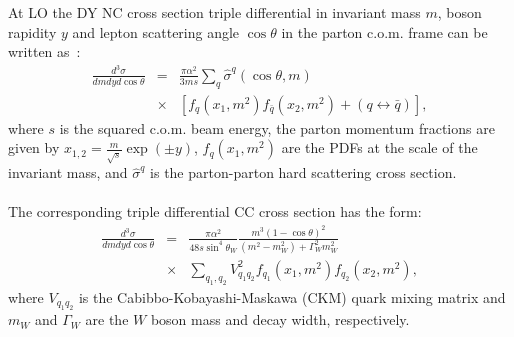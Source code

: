 
At LO the DY NC cross section triple differential in invariant mass \(m\), boson rapidity \(y\) 
and lepton scattering angle \(\cos\theta\) in the parton c.o.m. frame can be written as~\cite{Drell:1970wh,Yamada:1981mw}:
\begin{eqnarray}
 \frac{d^3\sigma}{dm{d}y d\cos\theta} &=&  
 \frac{\pi\alpha^2}{3ms}\sum\limits_{q}\hat{\sigma}^{q}(\cos\theta, m)  \nonumber \\
 &\times &\left[f_q(x_1,m^2)f_{\bar{q}}(x_2,m^2) 
 + (q\leftrightarrow\bar{q})\right],
\end{eqnarray}
where \(s\) is the squared c.o.m. beam energy, the parton momentum fractions are given by \(x_{1,2} = \frac{m}{\sqrt{s}}\exp(\pm y)\), $f_q(x_1,m^2)$ 
are the PDFs at the scale of the invariant mass, and 
$\hat{\sigma}^{q}$ is the parton-parton hard scattering cross section. 
%
\\
\\
The corresponding triple differential CC cross section has the form:
\begin{eqnarray}
\frac{d^3\sigma}{dmdyd\cos\theta} &=&
 \frac{\pi\alpha^2}{48s\sin^4\theta_W}
 \frac{m^3(1-\cos\theta)^2}{(m^2-m_W^2)+\Gamma_W^2m_W^2}  \nonumber \\
 &\times& \sum_{q_1,q_2}V_{q_1q_2}^2f_{q_1}(x_1,m^2)f_{q_2}(x_2,m^2),
\end{eqnarray}
where \(V_{q_1q_2}\) is the Cabibbo-Kobayashi-Maskawa (CKM) quark mixing matrix and \(m_W\) and \(\Gamma_W\)
are the \(W\) boson mass and decay width, respectively.


